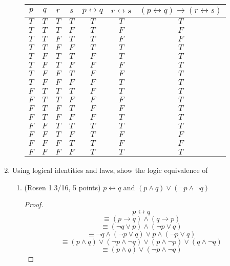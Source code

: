 \documentclass[11pt]{article}
\begin{document}
\begin{enumerate}
\begin{enumerate}
\begin{center}
\begin{tabular} {|c|c|c|c|c|c|c|}
\hline
$p$ & $q$ & $r$ & $s$ & $p \leftrightarrow q$ & $r \leftrightarrow s$ & $(p \leftrightarrow q) \rightarrow (r \leftrightarrow s)$ \\
\hline
$T$ & $T$ & $T$ & $T$ & $T$ & $T$ & $T$\\
$T$ & $T$ & $T$ & $F$ & $T$ & $F$ & $F$\\
$T$ & $T$ & $F$ & $T$ & $T$ & $F$ & $F$\\
$T$ & $T$ & $F$ & $F$ & $T$ & $T$ & $T$\\
$T$ & $F$ & $T$ & $T$ & $F$ & $T$ & $T$\\
$T$ & $F$ & $T$ & $F$ & $F$ & $F$ & $T$\\
$T$ & $F$ & $F$ & $T$ & $F$ & $F$ & $T$\\
$T$ & $F$ & $F$ & $F$ & $F$ & $T$ & $T$\\
$F$ & $T$ & $T$ & $T$ & $F$ & $T$ & $T$\\
$F$ & $T$ & $T$ & $F$ & $F$ & $F$ & $T$\\
$F$ & $T$ & $F$ & $T$ & $F$ & $F$ & $T$\\
$F$ & $T$ & $F$ & $F$ & $F$ & $T$ & $T$\\
$F$ & $F$ & $T$ & $T$ & $T$ & $T$ & $T$\\
$F$ & $F$ & $T$ & $F$ & $T$ & $F$ & $F$\\
$F$ & $F$ & $F$ & $T$ & $T$ & $F$ & $F$\\
$F$ & $F$ & $F$ & $F$ & $T$ & $T$ & $T$\\
\hline
\end{tabular}
\end{center}

\end{enumerate}

\item Using logical identities and laws, show the logic equivalence of
\begin{enumerate}
\item (Rosen 1.3/16, 5 points) $p\leftrightarrow q$ 
			and $(p\land q)\lor(\lnot p\land \lnot q)$
            
\begin{proof}

$$ p\leftrightarrow q $$
$$ \equiv (p \rightarrow q) \land (q \rightarrow p) $$
$$ \equiv (\lnot q \lor p) \land (\lnot p \lor q) $$
$$ \equiv \lnot q \land (\lnot p \lor q) \lor p \land (\lnot p \lor q) $$
$$ \equiv (p \land q) \lor (\lnot p \land \lnot q) \lor (p \land \lnot p) \lor (q \land \lnot q) $$
$$ \equiv (p \land q) \lor (\lnot p \land \lnot q) $$


\end{proof}
\end{enumerate}
\end{enumerate}
\end{document}
